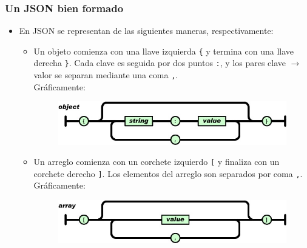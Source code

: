 \begin{frame}
\frametitle{Un JSON bien formado}
\begin{itemize}
\item	En JSON se representan de las siguientes maneras, respectivamente:
		\pause
\begin{itemize}
		\item	Un objeto comienza con una llave izquierda \texttt{\{} y termina con una llave derecha \texttt{\}}. Cada clave es seguida por dos puntos \texttt{:}, y los pares clave $\rightarrow$ valor se separan mediante una coma \texttt{,}. \\
				\pause
				Gráficamente: \\
				\begin{figure}
				\includegraphics[scale=0.4]{JSONObject}
				\end{figure}
				\pause
		\item	Un arreglo comienza con un corchete izquierdo \texttt{[} y finaliza con un corchete derecho \texttt{]}. Los elementos del arreglo son separados por coma \texttt{,}. \\
				\pause
				Gráficamente: \\
				\begin{figure}
				\includegraphics[scale=0.4]{JSONArray}
				\end{figure}
\end{itemize}
\end{itemize}
\end{frame}

